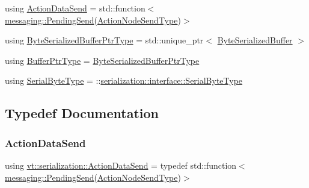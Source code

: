 \begin{DoxyCompactItemize}
\item 
using \hyperlink{namespacevt_1_1serialization_afffcac0da80b78e77ef8043dba4e814f}{Action\+Data\+Send} = std\+::function$<$ \hyperlink{structvt_1_1messaging_1_1_pending_send}{messaging\+::\+Pending\+Send}(\hyperlink{namespacevt_1_1serialization_ad4f189ca4817d31b73436c92bca55deb}{Action\+Node\+Send\+Type})$>$
\item 
using \hyperlink{namespacevt_1_1serialization_a8f2372c7f89aee28287323667fac2cf5}{Byte\+Serialized\+Buffer\+Ptr\+Type} = std\+::unique\+\_\+ptr$<$ \hyperlink{structvt_1_1serialization_1_1_byte_serialized_buffer}{Byte\+Serialized\+Buffer} $>$
\item 
using \hyperlink{namespacevt_1_1serialization_a88fa9b491e54f71b1a16d8464e5fc0a9}{Buffer\+Ptr\+Type} = \hyperlink{namespacevt_1_1serialization_a8f2372c7f89aee28287323667fac2cf5}{Byte\+Serialized\+Buffer\+Ptr\+Type}
\item 
using \hyperlink{namespacevt_1_1serialization_a74f8d1a55940f9c38fc29522de66d926}{Serial\+Byte\+Type} = \+::\hyperlink{namespaceserialization_1_1interface_a718748616a908c35e6080b71d7790a76}{serialization\+::interface\+::\+Serial\+Byte\+Type}
\end{DoxyCompactItemize}


\subsection{Typedef Documentation}
\mbox{\label{namespacevt_1_1serialization_afffcac0da80b78e77ef8043dba4e814f}} 
\subsubsection{\texorpdfstring{Action\+Data\+Send}{ActionDataSend}}
{\footnotesize\ttfamily using \hyperlink{namespacevt_1_1serialization_afffcac0da80b78e77ef8043dba4e814f}{vt\+::serialization\+::\+Action\+Data\+Send} = typedef std\+::function$<$\hyperlink{structvt_1_1messaging_1_1_pending_send}{messaging\+::\+Pending\+Send}(\hyperlink{namespacevt_1_1serialization_ad4f189ca4817d31b73436c92bca55deb}{Action\+Node\+Send\+Type})$>$}

\mbox{\label{namespacevt_1_1serialization_a009aa1de8d42a3c97643b947fcc6f0b6}} 
